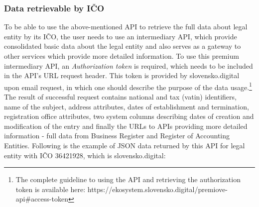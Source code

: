 \documentclass[thesis=B,english]{FITthesis}[2012/06/26]
\begin{document}
	\subsubsection{Data retrievable by IČO}
	To be able to use the above-mentioned API to retrieve the full data about legal entity by its IČO, the user needs to use an intermediary API, which provide consolidated basic data about the legal entity and also serves as a gateway to other services which provide more detailed information. To use this premium intermediary API, an \textit{Authorization token} is required, which needs to be included in the API's URL request header. This token is provided by slovensko.digital upon email request, in which one should describe the purpose of the data usage.\footnote{ The complete guideline to using the API and retrieving the authorization token is available here: https://ekosystem.slovensko.digital/premiove-api\#access-token} The result of successful request contains national and tax (vatin) identifiers, name of the subject, address attributes, dates of establishment and termination, registration office attributes, two system columns describing dates of creation and modification of the entry and finally the URLs to APIs providing more detailed information - full data from Business Register and Register of Accounting Entities. Following is the example of JSON data returned by this API for legal entity with IČO 36421928, which is slovensko.digital:
\end{document}
